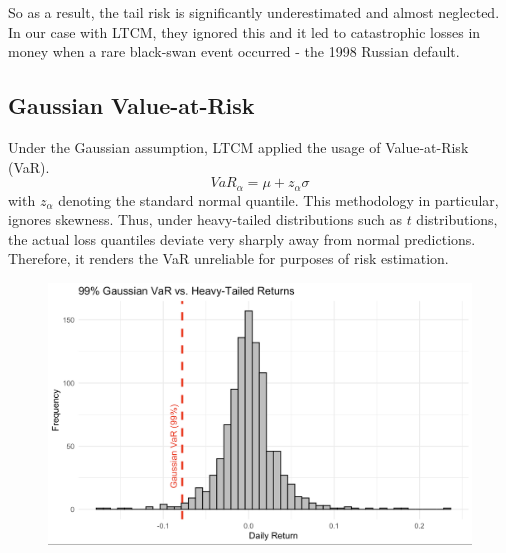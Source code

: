 \documentclass[11pt]{article}
\begin{document}
    So as a result, the tail risk is significantly underestimated and almost neglected. In our case with LTCM, they ignored this and it led to catastrophic losses in money when a rare black-swan event occurred - the 1998 Russian default.

    \subsection{Gaussian Value-at-Risk}
    Under the Gaussian assumption, LTCM applied the usage of Value-at-Risk (VaR).
    \begin{equation}
        VaR_\alpha = \mu + z_\alpha\sigma
    \end{equation}
    with $z_\alpha$ denoting the standard normal quantile. This methodology in particular, ignores skewness. Thus, under heavy-tailed distributions such as $t$ distributions, the actual loss quantiles deviate very sharply away from normal predictions. Therefore, it renders the VaR unreliable for purposes of risk estimation.
    
    \begin{figure}[H]
        \centering
        \begin{minipage}{0.6\textwidth}
            \includegraphics[width=\linewidth]{Graphs_Chris/var.png}
        \end{minipage}%
        \hfill
        \begin{minipage}{0.35\textwidth}
            \label{fig:var}
        \end{minipage}
    \end{figure}
\end{document}
